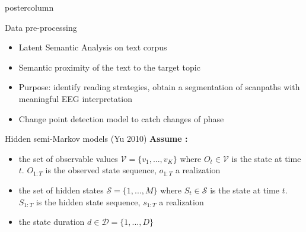 \documentclass[final,hyperref={pdfpagelabels=false}]{beamer}
\begin{document}
\begin{frame}
\begin{columns}
\begin{column}{.49\textwidth}
\begin{beamercolorbox}[center,wd=\textwidth]{postercolumn}
\begin{minipage}[T]{.95\textwidth}
{\begin{block}{Data pre-processing}
\begin{minipage}{0.45\textwidth}
\begin{itemize}
\begin{itemize}
                            \item[\bullet] Latent Semantic Analysis on text corpus
                            \item[\hookrightarrow] Semantic proximity of the text to the target topic
                        \end{itemize}
                    \end{itemize}
                \end{minipage}
                \begin{itemize}
                    \item[\bullet] Purpose: identify reading strategies, obtain a segmentation of scanpaths with meaningful EEG interpretation
                    \item[\hookrightarrow] Change point detection model to catch changes of phase
                \end{itemize}
            \end{block}

            \vfill
            \begin{block}{Hidden semi-Markov models (Yu 2010)}
                \textbf{Assume :}
                \vskip0.5cm
                \begin{itemize}
                    \item[\bullet] the set of observable values $\mathcal{V} = \{ v_1,..., v_K\}$
                    where $O_t \in \mathcal{V}$ is the state at time $t$. $O_{1:T}$ is the observed state sequence,
                    $o_{1:T}$ a realization
                    \item[\bullet] the set of hidden states $\mathcal{S}=\{1,...,M\}$
                    where $S_t \in \mathcal{S}$ is the state at time $t$. $S_{1:T}$ is the hidden state sequence,
                    $s_{1:T}$ a realization
                    \item[\bullet] the state duration $d \in \mathcal{D}=\{1,...,D\}$
                \end{itemize}


\end{block}}
\end{minipage}
\end{beamercolorbox}
\end{column}
\end{columns}
\end{frame}
\end{document}
